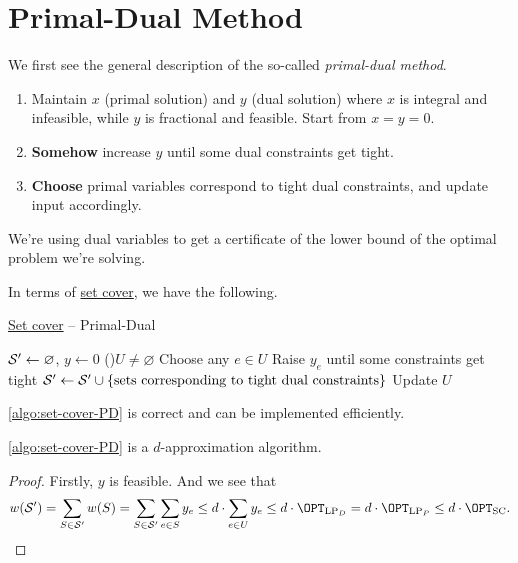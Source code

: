 \section{Primal-Dual Method}

We first see the general description of the so-called \emph{primal-dual method}.

\begin{enumerate}
	\item Maintain \(x\) (primal solution) and \(y\) (dual solution) where \(x\) is integral and infeasible, while \(y\) is fractional and feasible. Start from \(x = y = 0\).
	\item \textbf{Somehow} increase \(y\) until some dual constraints get tight.
	\item \textbf{Choose} primal variables correspond to tight dual constraints, and update input accordingly.
\end{enumerate}

\begin{remark}
	We're using dual variables to get a certificate of the lower bound of the optimal problem we're solving.
\end{remark}

In terms of \hyperref[prb:set-cover]{set cover}, we have the following.

\begin{algorithm}[H]\label{algo:set-cover-PD}
	\DontPrintSemicolon
	\caption{\hyperref[prb:set-cover]{Set cover} -- Primal-Dual}
	\BlankLine

	\(\mathcal{\MakeUppercase{S}} ^\prime \gets \varnothing\), \(y \gets 0\)\;
	\While(){\(U \neq \varnothing \)}{
		Choose any \(e\in U\)\;
		Raise \(y_e\) until some constraints get tight\;
		\(\mathcal{\MakeUppercase{S}} ^\prime \gets \mathcal{\MakeUppercase{S}} ^\prime \cup \left\{ \text{sets corresponding to tight dual constraints} \right\} \)\;
		Update \(U\)
	}
	\;
\end{algorithm}

\begin{remark}
	\autoref{algo:set-cover-PD} is correct and can be implemented efficiently.
\end{remark}

\begin{theorem}
	\autoref{algo:set-cover-PD} is a \(d\)-approximation algorithm.
\end{theorem}
\begin{proof}
	Firstly, \(y\) is feasible. And we see that
	\[
		w(\mathcal{\MakeUppercase{S}} ^\prime ) = \sum_{S\in \mathcal{\MakeUppercase{S}} ^\prime } w(S) = \sum_{S\in \mathcal{\MakeUppercase{S}} ^\prime }\sum_{e\in S}y_e \leq d\cdot \sum_{e\in U} y_e \leq d\cdot \OPT_{\mathrm{LP}_{D}} = d\cdot \OPT_{\mathrm{LP}_P}\leq d\cdot \OPT_{\mathrm{SC} }.
	\]
\end{proof}